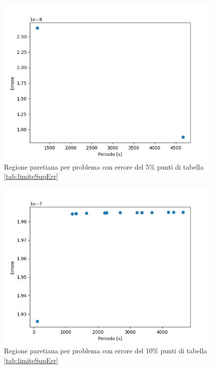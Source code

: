 \documentclass[a4paper,12pt]{report}
\begin{document}
\begin{itemize}
  \begin{figure}[H]
    \centering
    \includegraphics[scale=0.70]{img/puls0013/standard10_err5.png}
    \caption{Regione paretiana per problema con errore del 5\% punti di tabella \ref{tab:limiteSupErr}}
    \label{fig:reg_ammis_5_0013_std_err}
  \end{figure}

  \begin{figure}[H]
    \centering
    \includegraphics[scale=0.70]{img/puls0013/standard10_err10.png}
    \caption{Regione paretiana per problema con errore del 10\% punti di tabella \ref{tab:limiteSupErr}}
    \label{fig:reg_ammis_10_0013_std_err}
  \end{figure}



\end{itemize}
\end{document}
